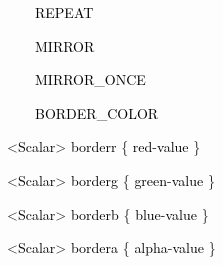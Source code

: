 \documentclass[a4paper]{article}
\newcommand\textstyleOOoComputerKeyWord[1]{\textrm{\textcolor[rgb]{0.0,0.0,0.5019608}{#1}}}
\newcommand\textstyleOOoAssemblerSpecialChar[1]{\textrm{\textcolor[rgb]{0.0,0.5019608,0.0}{#1}}}
\newcommand\textstyleOOoAssemblerIdent[1]{\textrm{\textcolor{black}{#1}}}
\begin{document}
{\color{black}
\textstyleOOoComputerKeyWord{\textcolor{black}{\ \ \ \ \ \ REPEAT}}}

{\color{black}
\textstyleOOoComputerKeyWord{\textcolor{black}{\ \ \ \ \ \ MIRROR}}}

{\color{black}
\textstyleOOoComputerKeyWord{\textcolor{black}{\ \ \ \ \ \ MIRROR\_ONCE}}}

{\color{black}
\textstyleOOoComputerKeyWord{\textcolor{black}{\ \ \ \ \ \ BORDER\_COLOR}}}


\bigskip

{\color{black}
\textstyleOOoComputerKeyWord{\textcolor{black}{\ \ }}\textstyleOOoAssemblerSpecialChar{{\textless}}\textstyleOOoAssemblerIdent{Scalar}\textstyleOOoAssemblerSpecialChar{{\textgreater}}\textstyleOOoComputerKeyWord{\textcolor{black}{
}}\textstyleOOoAssemblerIdent{borderr}\textstyleOOoComputerKeyWord{\textcolor{black}{
}}\textstyleOOoAssemblerSpecialChar{\{}\textstyleOOoComputerKeyWord{\textcolor{black}{
}}\textstyleOOoAssemblerIdent{red}\textstyleOOoAssemblerSpecialChar{{}-}\textstyleOOoAssemblerIdent{value}\textstyleOOoComputerKeyWord{\textcolor{black}{
}}\textstyleOOoAssemblerSpecialChar{\}}}

{\color{black}
\textstyleOOoComputerKeyWord{\textcolor{black}{\ \ }}\textstyleOOoAssemblerSpecialChar{{\textless}}\textstyleOOoAssemblerIdent{Scalar}\textstyleOOoAssemblerSpecialChar{{\textgreater}}\textstyleOOoComputerKeyWord{\textcolor{black}{
}}\textstyleOOoAssemblerIdent{borderg}\textstyleOOoComputerKeyWord{\textcolor{black}{
}}\textstyleOOoAssemblerSpecialChar{\{}\textstyleOOoComputerKeyWord{\textcolor{black}{
}}\textstyleOOoAssemblerIdent{green}\textstyleOOoAssemblerSpecialChar{{}-}\textstyleOOoAssemblerIdent{value}\textstyleOOoComputerKeyWord{\textcolor{black}{
}}\textstyleOOoAssemblerSpecialChar{\}}}

{\color{black}
\textstyleOOoComputerKeyWord{\textcolor{black}{\ \ }}\textstyleOOoAssemblerSpecialChar{{\textless}}\textstyleOOoAssemblerIdent{Scalar}\textstyleOOoAssemblerSpecialChar{{\textgreater}}\textstyleOOoComputerKeyWord{\textcolor{black}{
}}\textstyleOOoAssemblerIdent{borderb}\textstyleOOoComputerKeyWord{\textcolor{black}{
}}\textstyleOOoAssemblerSpecialChar{\{}\textstyleOOoComputerKeyWord{\textcolor{black}{
}}\textstyleOOoAssemblerIdent{blue}\textstyleOOoAssemblerSpecialChar{{}-}\textstyleOOoAssemblerIdent{value}\textstyleOOoComputerKeyWord{\textcolor{black}{
}}\textstyleOOoAssemblerSpecialChar{\}}}

{\color{black}
\textstyleOOoComputerKeyWord{\textcolor{black}{\ \ }}\textstyleOOoAssemblerSpecialChar{{\textless}}\textstyleOOoAssemblerIdent{Scalar}\textstyleOOoAssemblerSpecialChar{{\textgreater}}\textstyleOOoComputerKeyWord{\textcolor{black}{
}}\textstyleOOoAssemblerIdent{bordera}\textstyleOOoComputerKeyWord{\textcolor{black}{
}}\textstyleOOoAssemblerSpecialChar{\{}\textstyleOOoComputerKeyWord{\textcolor{black}{
}}\textstyleOOoAssemblerIdent{alpha}\textstyleOOoAssemblerSpecialChar{{}-}\textstyleOOoAssemblerIdent{value}\textstyleOOoComputerKeyWord{\textcolor{black}{
}}\textstyleOOoAssemblerSpecialChar{\}}}
\end{document}
